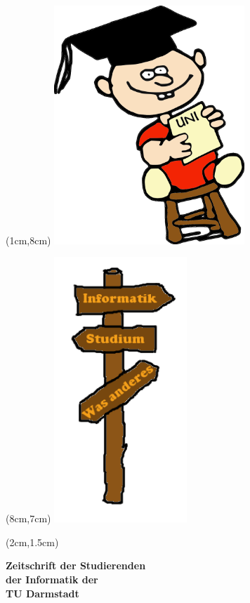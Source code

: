 \begin{titlepage}~


\begin{textblock*}{12cm}(1cm,8cm)
\includegraphics[height=9cm]{../grafik/wesen/wesen_uni}
\end{textblock*}

\begin{textblock*}{10cm}(8cm,7cm)
\includegraphics[height=10cm]{../grafik/schild}
\end{textblock*}


\begin{textblock*}{12cm}(2cm,1.5cm)
\begin{flushleft}
\large\sffamily\textbf{
\newline
Zeitschrift der Studierenden\\ 
der Informatik der \\
TU Darmstadt}  
\end{flushleft}
\end{textblock*}



\end{titlepage}

